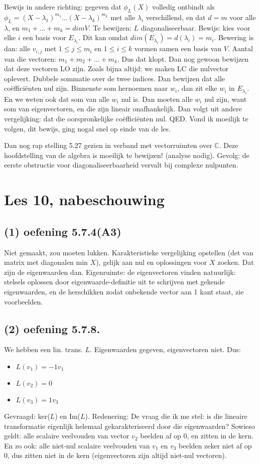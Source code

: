 \documentclass{article}
\begin{document}
Bewijs in andere richting: gegeven dat $\phi_L(X)$ volledig ontbindt als $\phi_L = (X-\lambda_1)^{m_1}...(X-\lambda_k)^{m_k}$ met alle $\lambda_i$ verschillend, en dat $d=m$ voor alle $\lambda$, en $m_1+...+m_k = dim V$. 
Te bewijzen: $L$ diagonaliseerbaar. 
Bewijs: kies voor elke $i$ een basis voor $E_{\lambda_i}$. Dit kan omdat $dim(E_{\lambda_i})=d(\lambda_i)=m_i$. Bewering is dan: alle $v_{i,j}$ met $1 \leq j \leq m_i$ en $1 \leq i \leq k$ vormen samen een basis van $V$. Aantal van die vectoren: $m_1+m_2+... + m_k$. Dus dat klopt. Dan nog gewoon bewijzen dat deze vectoren LO zijn. Zoals bijna altijd: we maken LC die nulvector oplevert. Dubbele sommatie over de twee indices. Dan bewijzen dat alle co\"effici\"enten nul zijn. Binnenste som hernoemen naar $w_i$, dan zit elke $w_i$ in $E_{\lambda_i}$. En we weten ook dat som van alle $w_i$ nul is. Dan moeten alle $w_i$ nul zijn, want som van eigenvectoren, en die zijn lineair onafhankelijk. Dan volgt uit andere vergelijking: dat die oorspronkelijke co\"effici\"enten nul. QED. 
Vond ik moeilijk te volgen, dit bewijs, ging nogal snel op einde van de les. 

Dan nog rap stelling 5.27 gezien in verband met vectorruimten over $\mathbb{C}$. Deze hoofdstelling van de algebra is moeilijk te bewijzen! (analyse nodig). Gevolg: de eerste obstructie voor diagonaliseerbaarheid vervalt bij complexe nulpunten. 

\section*{Les 10, nabeschouwing}

\subsection*{(1) oefening 5.7.4(A3)}
Niet gemaakt, zou moeten lukken. Karakteristieke vergelijking opstellen (det van matrix met diagonalen min $X$), gelijk aan nul en oplossingen voor $X$ zoeken. Dat zijn de eigenwaarden dan. 
Eigenruimte: de eigenvectoren vinden natuurlijk: stelsels oplossen door eigenwaarde-definitie uit te schrijven met gekende eigenwaarden, en de herschikken zodat onbekende vector aan 1 kant staat, zie voorbeelden. 

\subsection*{(2) oefening 5.7.8.}
We hebben een lin. trans. $L$. Eigenwaarden gegeven, eigenvectoren niet. Dus: 
\begin{itemize}
    \item $L(v_1)=-1v_1$
    \item $L(v_2)=0$
    \item $L(v_3)=1v_3$
\end{itemize}
Gevraagd: ker($L$) en Im($L$). 
Redenering: 
De vraag die ik me stel: is die lineaire transformatie eigenlijk helemaal gekarakteriseerd door die eigenwaarden? Sowieso geldt: alle scalaire veelvouden van vector $v_2$ beelden af op $0$, en zitten in de kern. En zo ook: alle niet-nul scalaire veelvouden van $v_1$ en $v_3$ beelden zeker niet af op $0$, dus zitten niet in de kern (eigenvectoren zijn altijd niet-nul vectoren). 
\end{document}
